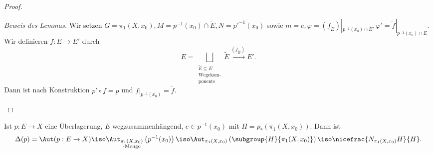 \documentclass[language=ngerman]{TemplateLecture} %
\begin{document}
\begin{proof}
\begin{description}
\begin{description}
            \emph{Beweis des Lemmas.} Wir setzen $G = \pi_1(X,x_0), M = p^{-1}(x_0) \cap \tilde{E}, N = p'^{-1}(x_0)$ sowie $m = e, \varphi = (f_{\tilde{E}})|_{p^{-1}(x_0) \cap \tilde{E}}, \varphi' = \tilde{f}|_{p^{-1}(x_0) \cap \tilde{E}}$. Wir definieren $f: E \to E'$ durch
            \begin{equation*}
                E = \bigsqcup_{\substack{\tilde{E} \subseteq E \\ \text{Wegekom-} \\\text{ponente}}} \tilde{E} \overset{(f_{\tilde{E}})}{\longrightarrow} E'.
            \end{equation*}
            Dann ist nach Konstruktion $p' \circ f = p$ und $f|_{p^{-1}(x_0)} = \tilde{f}$.
        \end{description}
    \end{description}
\end{proof}

\begin{remark}
    Ist $p: E \to X$ eine Überlagerung, $E$ wegzusammenhängend, $e \in p^{-1}(x_0)$ mit $H = p_*(\pi_1(X,x_0))$. Dann ist 
    \begin{align*}
        \Delta(p) = \Aut(p: E \to X) \iso \Aut_{\substack{\pi_1(X,x_0) \\ \text{-Menge}}}\left(p^{-1}(x_0)\right) \iso \Aut_{\pi_1(X,x_0)}\left(\subgroup{H}{\pi_1(X,x_0)}\right) \iso \nicefrac{N_{\pi_1(X,x_0)} H}{H}.
    \end{align*}
\end{remark}




\end{document}
